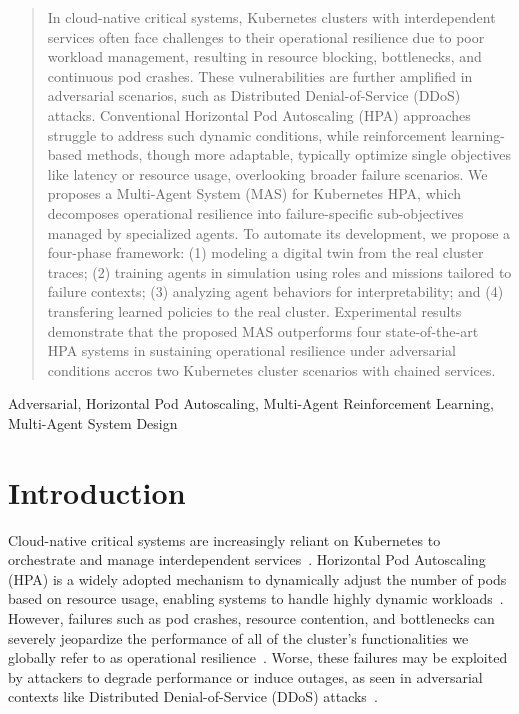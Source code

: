 \documentclass[conference]{IEEEtran}
\begin{document}
\maketitle

\begin{abstract}
    In cloud-native critical systems, Kubernetes clusters with interdependent services often face challenges to their operational resilience due to poor workload management, resulting in resource blocking, bottlenecks, and continuous pod crashes. These vulnerabilities are further amplified in adversarial scenarios, such as Distributed Denial-of-Service (DDoS) attacks. Conventional Horizontal Pod Autoscaling (HPA) approaches struggle to address such dynamic conditions, while reinforcement learning-based methods, though more adaptable, typically optimize single objectives like latency or resource usage, overlooking broader failure scenarios.
    We proposes a Multi-Agent System (MAS) for Kubernetes HPA, which decomposes operational resilience into failure-specific sub-objectives managed by specialized agents. To automate its development, we propose a four-phase framework: (1) modeling a digital twin from the real cluster traces; (2) training agents in simulation using roles and missions tailored to failure contexts; (3) analyzing agent behaviors for interpretability; and (4) transfering learned policies to the real cluster.
    Experimental results demonstrate that the proposed MAS outperforms four state-of-the-art HPA systems in sustaining operational resilience under adversarial conditions accros two Kubernetes cluster scenarios with chained services.
\end{abstract}

\begin{IEEEkeywords}
    Adversarial, Horizontal Pod Autoscaling, Multi-Agent Reinforcement Learning, Multi-Agent System Design
\end{IEEEkeywords}

\section{Introduction}
\label{sec:introduction}

Cloud-native critical systems are increasingly reliant on Kubernetes to orchestrate and manage interdependent services~\cite{Pahl2019}. Horizontal Pod Autoscaling (HPA) is a widely adopted mechanism to dynamically adjust the number of pods based on resource usage, enabling systems to handle highly dynamic workloads~\cite{Hohpe2012}. However, failures such as pod crashes, resource contention, and bottlenecks can severely jeopardize the performance of all of the cluster's functionalities we globally refer to as operational resilience~\cite{Burns2016}. Worse, these failures may be exploited by attackers to degrade performance or induce outages, as seen in adversarial contexts like Distributed Denial-of-Service (DDoS) attacks~\cite{Koller2019}.
\end{document}

